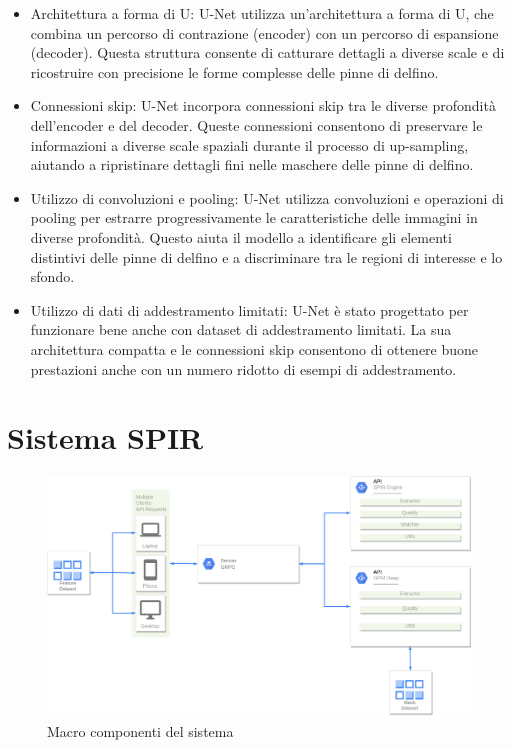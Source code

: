 \documentclass[a4paper,12pt]{report}
\begin{document}
      \begin{itemize}
        \item Architettura a forma di U: U-Net utilizza un'architettura a forma di U, che combina un percorso di contrazione (encoder) con un percorso di espansione (decoder). Questa struttura consente di catturare dettagli a diverse scale e di ricostruire con precisione le forme complesse delle pinne di delfino.
        \item Connessioni skip: U-Net incorpora connessioni skip tra le diverse profondità dell'encoder e del decoder. Queste connessioni consentono di preservare le informazioni a diverse scale spaziali durante il processo di up-sampling, aiutando a ripristinare dettagli fini nelle maschere delle pinne di delfino.
        \item Utilizzo di convoluzioni e pooling: U-Net utilizza convoluzioni e operazioni di pooling per estrarre progressivamente le caratteristiche delle immagini in diverse profondità. Questo aiuta il modello a identificare gli elementi distintivi delle pinne di delfino e a discriminare tra le regioni di interesse e lo sfondo.
        \item Utilizzo di dati di addestramento limitati: U-Net è stato progettato per funzionare bene anche con dataset di addestramento limitati. La sua architettura compatta e le connessioni skip consentono di ottenere buone prestazioni anche con un numero ridotto di esempi di addestramento.
      \end{itemize}

    \section{Sistema SPIR}
    \begin{figure}[H]
      \centering
      \includegraphics[width=\textwidth]{assets/images/methods/backend/backend_server.drawio.png}   
      \caption{Macro componenti del sistema}
    \end{figure}
    
\end{document}
